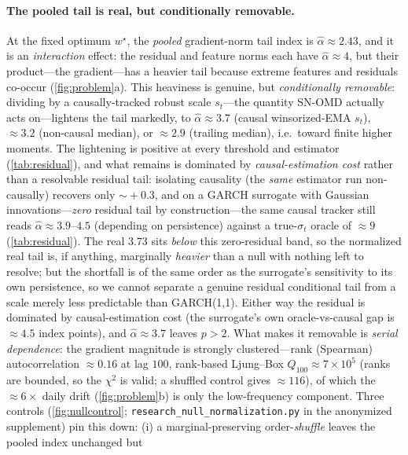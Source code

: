 \documentclass{article}
\begin{document}
\paragraph{The pooled tail is real, but conditionally removable.} At
the fixed optimum $w^\star$, the \emph{pooled} gradient-norm tail index is
$\hat\alpha\approx2.43$, and it is an \emph{interaction} effect: the residual and feature
norms each have $\hat\alpha\approx4$, but their product---the gradient---has a heavier
tail because extreme features and residuals co-occur (\cref{fig:problem}a). This heaviness
is genuine, but \emph{conditionally removable}: dividing by a causally-tracked robust scale
$s_t$---the quantity SN-OMD actually acts on---lightens the tail markedly, to
$\hat\alpha\approx3.7$ (causal winsorized-EMA $s_t$), $\approx3.2$ (non-causal median), or
$\approx2.9$ (trailing median), i.e.\ toward finite higher moments. The lightening is
positive at every threshold and estimator (\cref{tab:residual}), and what remains is dominated
by \emph{causal-estimation cost} rather than a resolvable residual tail: isolating causality (the
\emph{same} estimator run non-causally) recovers only $\sim\!+0.3$, and on a GARCH surrogate
with Gaussian innovations---\emph{zero} residual tail by construction---the same causal
tracker still reads $\hat\alpha\approx3.9$--$4.5$ (depending on persistence) against a
true-$\sigma_t$ oracle of $\approx9$ (\cref{tab:residual}). The real
$3.73$ sits \emph{below} this zero-residual band, so the normalized real tail is, if
anything, marginally \emph{heavier} than a null with nothing left to resolve; but the
shortfall is of the same order as the surrogate's sensitivity to its own persistence, so we
cannot separate a genuine residual conditional tail from a scale merely less predictable than
GARCH(1,1). Either way the residual is dominated by causal-estimation cost (the surrogate's
own oracle-vs-causal gap is $\approx4.5$ index points), and $\hat\alpha\approx3.7$ leaves
$p>2$. What makes it removable is \emph{serial dependence}: the gradient magnitude is strongly clustered---rank (Spearman)
autocorrelation $\approx0.16$ at lag $100$, rank-based Ljung--Box $Q_{100}\approx7\!\times\!
10^{5}$ (ranks are bounded, so the $\chi^2$ is valid; a shuffled control gives $\approx116$),
of which the $\approx6\times$ daily drift (\cref{fig:problem}b) is only the low-frequency
component. Three controls (\cref{fig:nullcontrol}; \texttt{research\_null\_normalization.py} in the anonymized supplement) pin this
down: (i) a marginal-preserving order-\emph{shuffle} leaves the pooled index unchanged but
\end{document}
